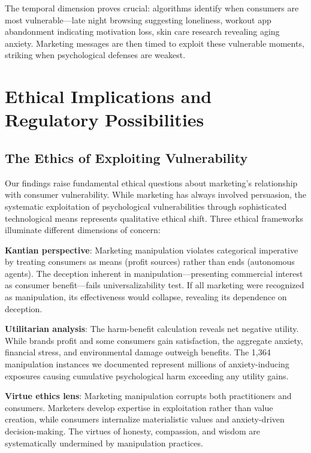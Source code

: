 The temporal dimension proves crucial: algorithms identify when consumers are most vulnerable—late night browsing suggesting loneliness, workout app abandonment indicating motivation loss, skin care research revealing aging anxiety. Marketing messages are then timed to exploit these vulnerable moments, striking when psychological defenses are weakest.

\section{Ethical Implications and Regulatory Possibilities}
\label{sec:ethics_regulation}

\subsection{The Ethics of Exploiting Vulnerability}

Our findings raise fundamental ethical questions about marketing's relationship with consumer vulnerability. While marketing has always involved persuasion, the systematic exploitation of psychological vulnerabilities through sophisticated technological means represents qualitative ethical shift. Three ethical frameworks illuminate different dimensions of concern:

\textbf{Kantian perspective}: Marketing manipulation violates categorical imperative by treating consumers as means (profit sources) rather than ends (autonomous agents). The deception inherent in manipulation—presenting commercial interest as consumer benefit—fails universalizability test. If all marketing were recognized as manipulation, its effectiveness would collapse, revealing its dependence on deception.

\textbf{Utilitarian analysis}: The harm-benefit calculation reveals net negative utility. While brands profit and some consumers gain satisfaction, the aggregate anxiety, financial stress, and environmental damage outweigh benefits. The 1,364 manipulation instances we documented represent millions of anxiety-inducing exposures causing cumulative psychological harm exceeding any utility gains.

\textbf{Virtue ethics lens}: Marketing manipulation corrupts both practitioners and consumers. Marketers develop expertise in exploitation rather than value creation, while consumers internalize materialistic values and anxiety-driven decision-making. The virtues of honesty, compassion, and wisdom are systematically undermined by manipulation practices.

